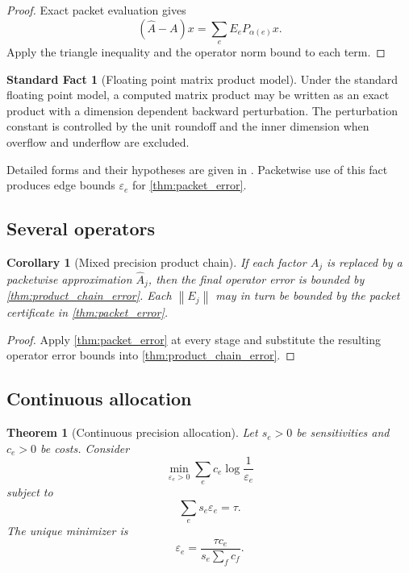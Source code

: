 \documentclass{aomart}
\newtheorem{theorem}{Theorem}[section]
\newtheorem{corollary}[corollary]{Corollary}
\theoremstyle{definition}
\newtheorem{standardfact}[standardfact]{Standard Fact}
\theoremstyle{remark}
\newcommand{\norm}[1]{\left\lVert#1\right\rVert}
\newcommand{\eps}{\varepsilon}
\begin{document}
\begin{proof}
Exact packet evaluation gives
\[
(\widehat A-A)x
=
\sum_eE_eP_{\alpha(e)}x.
\]
Apply the triangle inequality and the operator norm bound to each term.
\end{proof}

\begin{standardfact}[Floating point matrix product model]\label{fact:rounding}
Under the standard floating point model, a computed matrix product may be written as an exact product with a dimension dependent backward perturbation. The perturbation constant is controlled by the unit roundoff and the inner dimension when overflow and underflow are excluded.
\end{standardfact}

Detailed forms and their hypotheses are given in \cite{Higham2002}. Packetwise use of this fact produces edge bounds \(\eps_e\) for \cref{thm:packet_error}.

\subsection{Several operators}

\begin{corollary}[Mixed precision product chain]\label{cor:mixed_chain}
If each factor \(A_j\) is replaced by a packetwise approximation \(\widehat A_j\), then the final operator error is bounded by \cref{thm:product_chain_error}. Each \(\norm{E_j}\) may in turn be bounded by the packet certificate in \cref{thm:packet_error}.
\end{corollary}

\begin{proof}
Apply \cref{thm:packet_error} at every stage and substitute the resulting operator error bounds into \cref{thm:product_chain_error}.
\end{proof}

\subsection{Continuous allocation}

\begin{theorem}[Continuous precision allocation]\label{thm:continuous_precision}
Let \(s_e>0\) be sensitivities and \(c_e>0\) be costs. Consider
\[
\min_{\eps_e>0}
\sum_e c_e\log\frac1{\eps_e}
\]
subject to
\[
\sum_es_e\eps_e=\tau.
\]
The unique minimizer is
\[
\boxed{
\eps_e
=
\frac{\tau c_e}{s_e\sum_fc_f}.
}
\]
\end{theorem}
\end{document}
